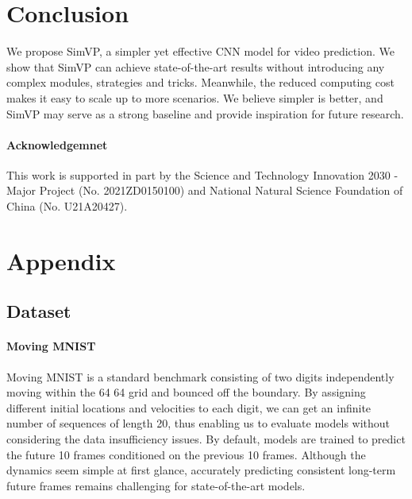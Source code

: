 \documentclass[10pt,twocolumn,letterpaper]{article}
\begin{document}
\vspace{-2mm}
\section{Conclusion}
We propose SimVP, a simpler yet effective CNN model for video prediction. We show that SimVP can achieve state-of-the-art results without introducing any complex modules, strategies and tricks. Meanwhile, the reduced computing cost makes it easy to scale up to more scenarios. We believe simpler is better, and SimVP may serve as a strong baseline and provide inspiration for future research.

\vspace{-3mm}
\paragraph{Acknowledgemnet}

This work is supported in part by the Science and Technology Innovation 2030 - Major Project (No. 2021ZD0150100) and National Natural Science Foundation of China (No. U21A20427).






          













\clearpage
{\small


}

\clearpage
\section{Appendix}
\subsection{Dataset}
\paragraph{Moving MNIST} Moving MNIST \cite{srivastava2015unsupervised} is a standard benchmark consisting of two digits independently moving within the 64  64 grid and bounced off the boundary. By assigning different initial locations and velocities to each digit, we can get an infinite number of sequences of length 20, thus enabling us to evaluate models without considering the data insufficiency issues. By default, models are trained to predict the future 10 frames conditioned on the previous 10 frames. Although the dynamics seem simple at first glance, accurately predicting consistent long-term future frames remains challenging for state-of-the-art models.
\end{document}

